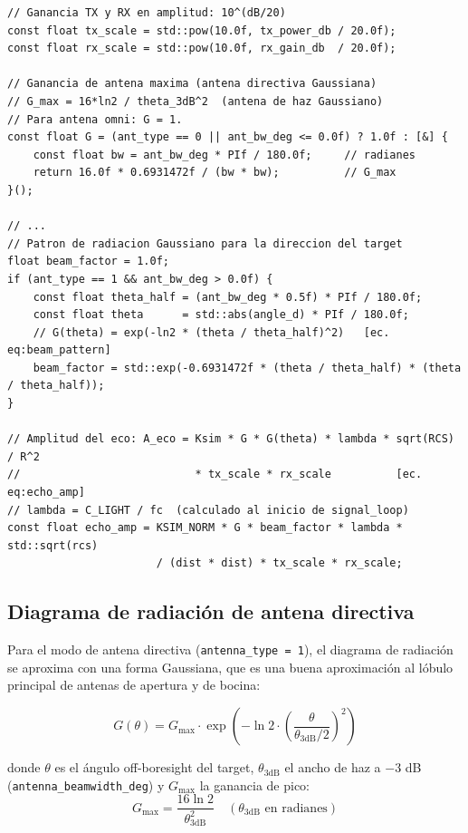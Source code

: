 \documentclass[11pt,a4paper]{article}
\begin{document}
\begin{lstlisting}[style=cpp,
  caption={Cálculo de la amplitud del eco — ChannelSimulator.cpp, líneas 105--143}]
// Ganancia TX y RX en amplitud: 10^(dB/20)
const float tx_scale = std::pow(10.0f, tx_power_db / 20.0f);
const float rx_scale = std::pow(10.0f, rx_gain_db  / 20.0f);

// Ganancia de antena maxima (antena directiva Gaussiana)
// G_max = 16*ln2 / theta_3dB^2  (antena de haz Gaussiano)
// Para antena omni: G = 1.
const float G = (ant_type == 0 || ant_bw_deg <= 0.0f) ? 1.0f : [&] {
    const float bw = ant_bw_deg * PIf / 180.0f;     // radianes
    return 16.0f * 0.6931472f / (bw * bw);          // G_max
}();

// ...
// Patron de radiacion Gaussiano para la direccion del target
float beam_factor = 1.0f;
if (ant_type == 1 && ant_bw_deg > 0.0f) {
    const float theta_half = (ant_bw_deg * 0.5f) * PIf / 180.0f;
    const float theta      = std::abs(angle_d) * PIf / 180.0f;
    // G(theta) = exp(-ln2 * (theta / theta_half)^2)   [ec. eq:beam_pattern]
    beam_factor = std::exp(-0.6931472f * (theta / theta_half) * (theta / theta_half));
}

// Amplitud del eco: A_eco = Ksim * G * G(theta) * lambda * sqrt(RCS) / R^2
//                           * tx_scale * rx_scale          [ec. eq:echo_amp]
// lambda = C_LIGHT / fc  (calculado al inicio de signal_loop)
const float echo_amp = KSIM_NORM * G * beam_factor * lambda * std::sqrt(rcs)
                       / (dist * dist) * tx_scale * rx_scale;
\end{lstlisting}

\subsection{Diagrama de radiación de antena directiva}

Para el modo de antena directiva (\texttt{antenna\_type = 1}), el diagrama de radiación
se aproxima con una forma Gaussiana, que es una buena aproximación al lóbulo principal
de antenas de apertura y de bocina:

\begin{equation}
  G(\theta) = G_\text{max} \cdot \exp\!\left(-\ln 2 \cdot \left(\frac{\theta}{\theta_{3\text{dB}}/2}\right)^{\!2}\right)
  \label{eq:beam_pattern}
\end{equation}

donde $\theta$ es el ángulo off-boresight del target, $\theta_{3\text{dB}}$ el ancho de
haz a $-3$ dB (\texttt{antenna\_beamwidth\_deg}) y $G_\text{max}$ la ganancia de pico:
\begin{equation}
  G_\text{max} = \frac{16 \ln 2}{\theta_{3\text{dB}}^2} \quad (\theta_{3\text{dB}} \text{ en radianes})
  \label{eq:gain_max}
\end{equation}
\end{document}
